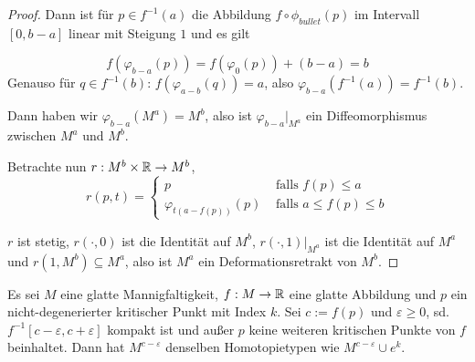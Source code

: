 \begin{proof}
    Dann ist für $p \in f^{-1}(a)$ die Abbildung $f \circ \phi_{bullet}(p)$ im Intervall $[0, b - a]$
    linear mit Steigung $1$ und es gilt 

    \[ f(\varphi_{b - a}(p)) = f(\varphi_{0}(p)) + (b - a) = b \]
    Genauso für $q \in f^{-1}(b)$: $f(\varphi_{a - b}(q)) = a$, also 
    $\varphi_{b - a}(f^{-1}(a)) = f^{-1}(b)$.

    Dann haben wir $\varphi_{b - a} (M^a) = M^b$, also ist $\varphi_{b - a}|_{M^a}$ ein 
    Diffeomorphismus zwischen $M^a$ und $M^b$. 

    Betrachte nun $r: M^b \times { \mathbb R } \to M^b$,
    \[  
        r(p, t) = \begin{cases}
            p & \text{ falls } f(p) \leq a \\
            \varphi_{t(a - f(p))}(p) & \text{ falls } a \leq f(p) \leq b 
        \end{cases}
    \]

    $r$ ist stetig, $r(\cdot, 0)$ ist die Identität auf $M^b$, 
    $r(\cdot, 1)|_{M^a}$ ist die Identität auf $M^a$ und 
    $r(1, M^b) \subseteq M^a$, also ist $M^a$ ein Deformationsretrakt von $M^b$.
\end{proof}

\begin{theorem}
    \label{satz: zweites deformationslemma}
    Es sei $M$ eine glatte Mannigfaltigkeit, $f: M \rightarrow { \mathbb R }$ eine glatte
    Abbildung und $p$ ein nicht-degenerierter kritischer Punkt mit Index 
    $k$. Sei $c := f(p)$ und $\varepsilon \geq 0$, sd. 
    $f^{-1}[c - \varepsilon, c + \varepsilon]$ kompakt ist und außer $p$ keine 
    weiteren kritischen Punkte von $f$ beinhaltet. Dann hat $M^{c-\varepsilon}$
    denselben Homotopietypen wie $M^{c - \varepsilon} \cup e^k$.
\end{theorem}

